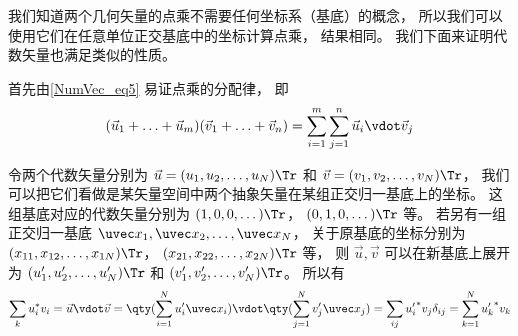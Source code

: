 我们知道两个几何矢量的点乘不需要任何坐标系（基底）的概念， 所以我们可以使用它们在任意单位正交基底中的坐标计算点乘， 结果相同。 我们下面来证明代数矢量也满足类似的性质。

首先由\autoref{NumVec_eq5} 易证点乘的分配律， 即
\begin{equation}
(\vec u_1 + \ldots + \vec u_m)(\vec v_1 + \ldots + \vec v_n) = \sum_{i=1}^m \sum_{j=1}^n \vec u_i \vdot \vec v_j
\end{equation}

令两个代数矢量分别为 $\vec u = (u_1, u_2, \dots, u_N)\Tr$ 和 $\vec v = (v_1, v_2, \dots, v_N)\Tr$， 我们可以把它们看做是某矢量空间中两个抽象矢量在某组正交归一基底上的坐标。 这组基底对应的代数矢量分别为 $(1, 0, 0, \dots)\Tr$， $(0, 1, 0, \dots)\Tr$ 等。 若另有一组正交归一基底 $\uvec x_1, \uvec x_2, \dots, \uvec x_N$， 关于原基底的坐标分别为 $(x_{11}, x_{12}, \dots, x_{1N})\Tr$， $(x_{21}, x_{22}, \dots, x_{2N})\Tr$ 等， 则 $\vec u, \vec v$ 可以在新基底上展开为 $(u'_1, u'_2, \dots, u'_N)\Tr$ 和 $(v'_1, v'_2, \dots, v'_N)\Tr$。 所以有
\begin{equation}
\sum_k u_i^* v_i = \vec u \vdot \vec v = \qty(\sum_{i=1}^N u'_i \uvec x_i)\vdot\qty(\sum_{j=1}^N v'_j \uvec x_j) = \sum_{ij} {u'_i}^* v_j \delta_{ij} = \sum_{k=1}^N {u'_k}^* v_k
\end{equation}







